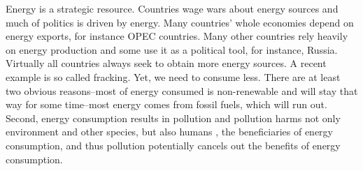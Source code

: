 \documentclass[10pt, letterpaper]{article}
\begin{document}
\begin{spacing}{1.4}

 Energy is a strategic
resource. Countries wage wars about energy sources  and much of politics is
driven by energy. Many countries' whole economies depend on energy exports, for instance OPEC countries. Many other countries rely heavily on energy production
and some use it as a political tool, for instance, Russia.   
Virtually all countries  always seek to obtain more energy sources. A recent example is so called
fracking. Yet, we need to consume less. There are at least two
obvious reasons--most of energy consumed  is non-renewable and will stay
that way for some time\cite{mackay08}--most energy comes from
fossil fuels, which will run out. %
Second, energy consumption results in pollution and pollution harms not only
 environment and other species, but also  humans \cite{mackerron09,gandelman12,ferreira13}, the beneficiaries of energy
consumption, and thus pollution potentially cancels out the benefits of energy
consumption. 
 

\end{spacing}
\end{document}
